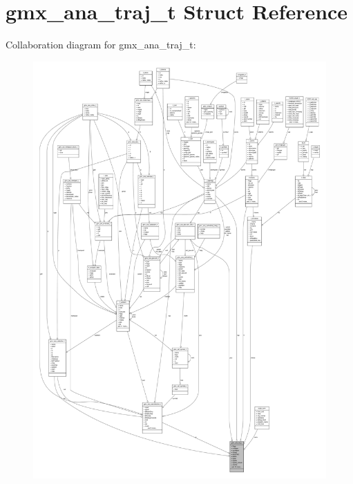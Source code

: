 \hypertarget{structgmx__ana__traj__t}{\section{gmx\-\_\-ana\-\_\-traj\-\_\-t \-Struct \-Reference}
\label{structgmx__ana__traj__t}
}


\-Collaboration diagram for gmx\-\_\-ana\-\_\-traj\-\_\-t\-:
\nopagebreak
\begin{figure}[H]
\begin{center}
\leavevmode
\includegraphics[width=350pt]{structgmx__ana__traj__t__coll__graph}
\end{center}
\end{figure}
